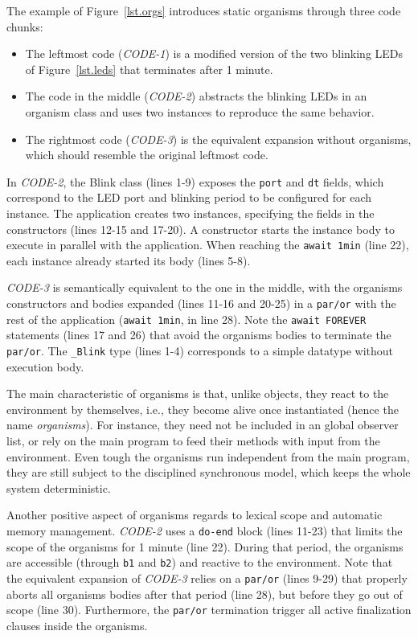 \documentclass{acm_proc_article-sp}
\newcommand{\CEU}{\textsc{C\'{e}u}\xspace}
\newcommand{\code}[1] {{\small{\texttt{#1}}}}
\newcommand{\1}{\;}
\newcommand{\2}{\;\;}
\newcommand{\3}{\;\;\;}
\newcommand{\5}{\;\;\;\;\;}
\begin{document}
The example of Figure~\ref{lst.orgs} introduces static organisms through three 
code chunks:
%
\begin{itemize}
\item The leftmost code (\emph{CODE-1}) is a modified version of the two 
blinking LEDs of Figure~\ref{lst.leds} that terminates after 1 minute.
%
\item The code in the middle (\emph{CODE-2}) abstracts the blinking LEDs in an 
organism class and uses two instances to reproduce the same behavior.
%
\item The rightmost code (\emph{CODE-3}) is the equivalent expansion without 
organisms, which should resemble the original leftmost code.
\end{itemize}
%
In \emph{CODE-2}, the Blink class (lines 1-9) exposes the \code{port} and 
\code{dt} fields, which correspond to the LED port and blinking period to be 
configured for each instance.
The application creates two instances, specifying the fields in the 
constructors (lines 12-15 and 17-20).
A constructor starts the instance body to execute in parallel with the 
application.
When reaching the \code{await 1min} (line 22), each instance already started 
its body (lines 5-8).

\emph{CODE-3} is semantically equivalent to the one in the middle, with the 
organisms constructors and bodies expanded (lines 11-16 and 20-25) in a 
\code{par/or} with the rest of the application (\code{await 1min}, in line 28).  
Note the \code{await FOREVER} statements (lines 17 and 26) that avoid the 
organisms bodies to terminate the \code{par/or}.
The \code{\_Blink} type (lines 1-4) corresponds to a simple datatype without 
execution body.

The main characteristic of organisms is that, unlike objects, they react to the 
environment by themselves, i.e., they become alive once instantiated (hence the 
name \emph{organisms}).
%
For instance, they need not be included in an global observer list, or rely on 
the main program to feed their methods with input from the environment.
%
Even tough the organisms run independent from the main program, they are still 
subject to the disciplined synchronous model, which keeps the whole system 
deterministic.
%

Another positive aspect of organisms regards to lexical scope and automatic 
memory management.
%
\emph{CODE-2} uses a \code{do-end} block (lines 11-23) that limits the scope of 
the organisms for 1 minute (line 22).
%
During that period, the organisms are accessible (through \code{b1} and 
\code{b2}) and reactive to the environment.
%
Note that the equivalent expansion of \emph{CODE-3} relies on a \code{par/or} 
(lines 9-29) that properly aborts all organisms bodies after that period (line 
28), but before they go out of scope (line 30).
%
Furthermore, the \code{par/or} termination trigger all active finalization 
clauses inside the organisms.
\end{document}
